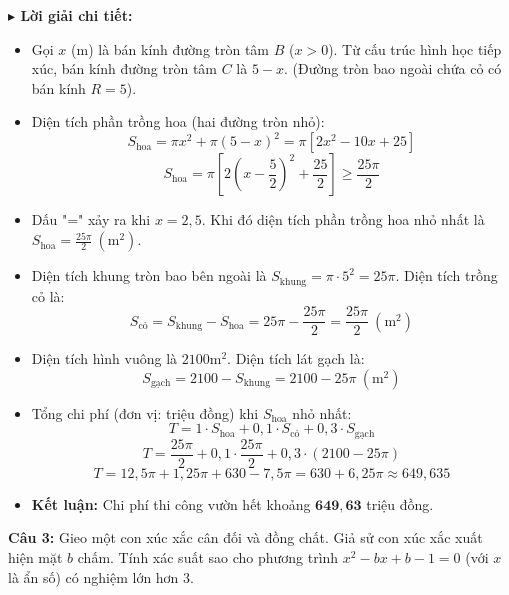 \documentclass[12pt, a4paper, landscape]{article}
\newlength{\boxheight}
\begin{document}
\begin{minipage}[t]{0.53\textwidth}
\begin{tcolorbox}[solution_box={BÓC TÁCH LỜI GIẢI}, height=\boxheight]
\small
\textbf{\textsf{$\blacktriangleright$ Lời giải chi tiết:}}
\begin{itemize}[leftmargin=*, itemsep=4pt, parsep=0pt, topsep=2pt]
    \item Gọi $x$ (m) là bán kính đường tròn tâm $B$ ($x > 0$). Từ cấu trúc hình học tiếp xúc, bán kính đường tròn tâm $C$ là $5 - x$. (Đường tròn bao ngoài chứa cỏ có bán kính $R = 5$).
    \item Diện tích phần trồng hoa (hai đường tròn nhỏ):
    $$ S_{\text{hoa}} = \pi x^2 + \pi(5-x)^2 = \pi [2x^2 - 10x + 25] $$
    $$ S_{\text{hoa}} = \pi \left[ 2\left(x - \frac{5}{2}\right)^2 + \frac{25}{2} \right] \ge \frac{25\pi}{2} $$
    \item Dấu "=" xảy ra khi $x = 2,5$. Khi đó diện tích phần trồng hoa nhỏ nhất là $S_{\text{hoa}} = \frac{25\pi}{2} \ (\text{m}^2)$.
    \item Diện tích khung tròn bao bên ngoài là $S_{\text{khung}} = \pi \cdot 5^2 = 25\pi$. Diện tích trồng cỏ là:
    $$ S_{\text{cỏ}} = S_{\text{khung}} - S_{\text{hoa}} = 25\pi - \frac{25\pi}{2} = \frac{25\pi}{2} \ (\text{m}^2) $$
    \item Diện tích hình vuông là $2100\text{m}^2$. Diện tích lát gạch là:
    $$ S_{\text{gạch}} = 2100 - S_{\text{khung}} = 2100 - 25\pi \ (\text{m}^2) $$
    \item Tổng chi phí (đơn vị: triệu đồng) khi $S_{\text{hoa}}$ nhỏ nhất:
    $$ T = 1 \cdot S_{\text{hoa}} + 0,1 \cdot S_{\text{cỏ}} + 0,3 \cdot S_{\text{gạch}} $$
    $$ T = \frac{25\pi}{2} + 0,1 \cdot \frac{25\pi}{2} + 0,3 \cdot (2100 - 25\pi) $$
    $$ T = 12,5\pi + 1,25\pi + 630 - 7,5\pi = 630 + 6,25\pi \approx 649,635 $$
    \item \textbf{Kết luận:} Chi phí thi công vườn hết khoảng $\mathbf{649,63}$ triệu đồng.
\end{itemize}
\end{tcolorbox}
\end{minipage}

\newpage

\enlargethispage{2.5cm}
\begin{tcolorbox}[question_box={ĐỀ SỐ 01 - PHẦN IV - CÂU 3 (TRANG 3/3)}]
\small
\textbf{Câu 3:} Gieo một con xúc xắc cân đối và đồng chất. Giả sử con xúc xắc xuất hiện mặt $b$ chấm. Tính xác suất sao cho phương trình $x^2 - bx + b - 1 = 0$ (với $x$ là ẩn số) có nghiệm lớn hơn 3.
\end{tcolorbox}
\end{document}
